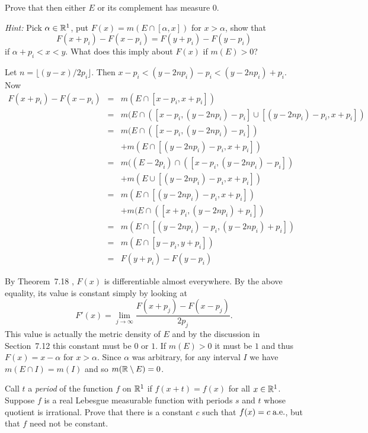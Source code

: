 \begin{enumerate}
\begin{excopy}
Prove that then either $E$ or its complement has measure $0$.

\emph{Hint:} Pick \(\alpha\in\mathbb{R}^1\), 
put \(F(x) = m(E\cap[\alpha,x])\) for \(x>\alpha\), show that
\begin{equation*}
F(x + p_i) - F(x - p_i) = F(y + p_i) - F(y - p_i)
\end{equation*}
if \(\alpha + p_i < x < y\). 
What does this imply about \(F(x)\) if \(m(E)>0\)?
\end{excopy}

Let \(n = \lfloor (y-x)/2p_i \rfloor\).
Then \(x - p_i < (y-2np_i) - p_i < (y-2np_i) + p_i\).
Now
\begin{eqnarray*}
F(x + p_i) - F(x - p_i) 
&=& m(E \cap [x-p_i, x+p_i]) \\
&=& m(E \cap ([x-p_i, (y-2np_i) - p_i] \cup [(y-2np_i) - p_i, x+p_i]) \\
&=& m(E \cap ([x-p_i, (y-2np_i) - p_i]) \\
& & + m(E \cap [(y-2np_i) - p_i, x+p_i]) \\
&=& m((E - 2p_i) \cap ([x-p_i, (y-2np_i) - p_i]) \\
& & + m(E \cup [(y-2np_i) - p_i, x+p_i]) \\
&=& m(E \cap [(y-2np_i) - p_i, x+p_i]) \\
& & + m(E \cap ([x+p_i, (y-2np_i) + p_i]) \\
&=& m(E \cap [(y-2np_i) - p_i, (y-2np_i) + p_i]) \\
&=& m(E \cap [y - p_i, y + p_i]) \\
&=& F(y + p_i) - F(y - p_i)
\end{eqnarray*}

By Theorem~7.18 \cite{RudinRCA87}, \(F(x)\) is differentiable
almost everywhere. By the above equality, its value is constant
simply by looking at 
\begin{equation*}
F'(x) = \lim_{j\to\infty} \frac{F(x+p_j) - F(x-p_j)}{2p_j}.
\end{equation*}
This value is actually the 
metric density
of $E$ and by the discussion in Section~7.12 \cite{RudinRCA87}
this constant must be $0$ or $1$. If \(m(E)>0\) it must be $1$
and thus \(F(x) = x-\alpha\) for \(x>\alpha\).
Since \(\alpha\) was arbitrary, for any interval $I$ we have
\(m(E\cap I) = m(I)\) and so \(m(\mathbb{R}\setminus E) = 0\).


\begin{excopy}
Call $t$ a 
\emph{period}
of the function $f$ on \(\mathbb{R}^1\) if \(f(x+t)=f(x)\) for all \(x\in\mathbb{R}^1\).
Suppose $f$ is a real Lebesgue measurable function with periods $s$ and $t$
whose quotient is irrational.
Prove that there is a constant $c$ such that \(f(x)=c\;\textrm{a.e.}\),
but that $f$ need not be constant.


\end{excopy}
\end{enumerate}

